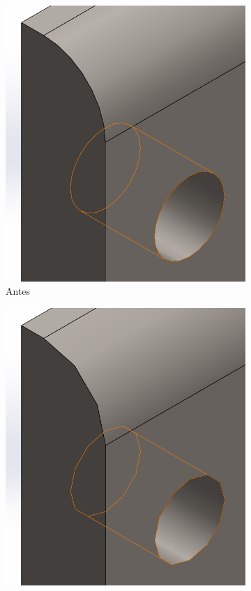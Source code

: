 \documentclass{report}
\begin{document}
\begin{figure}[H]
	\centering
	\begin{subfigure}[b]{0.45\textwidth}
		\includegraphics[width=\textwidth]{Imagenes/solidworks_macro_15}
		\caption{Antes}
		\label{fig:solidworksmacro15}
	\end{subfigure}
	\begin{subfigure}[b]{0.45\textwidth}
		\includegraphics[width=\textwidth]{Imagenes/solidworks_macro_16}

\end{subfigure}
\end{figure}
\end{document}
